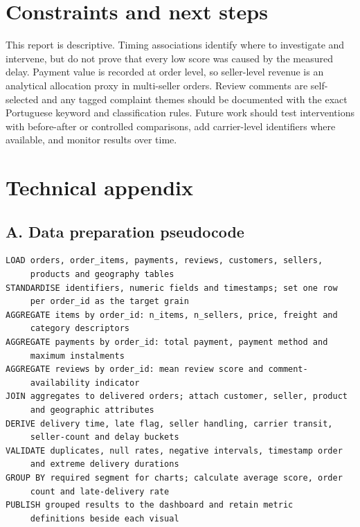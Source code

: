 \documentclass[11pt,a4paper]{article}
\begin{document}
\section{Constraints and next steps}

This report is descriptive. Timing associations identify where to investigate and intervene, but do not prove that every low score was caused by the measured delay. Payment value is recorded at order level, so seller-level revenue is an analytical allocation proxy in multi-seller orders. Review comments are self-selected and any tagged complaint themes should be documented with the exact Portuguese keyword and classification rules. Future work should test interventions with before-after or controlled comparisons, add carrier-level identifiers where available, and monitor results over time.

\newpage
\section*{Technical appendix}

\subsection*{A. Data preparation pseudocode}

\begin{verbatim}
LOAD orders, order_items, payments, reviews, customers, sellers,
     products and geography tables
STANDARDISE identifiers, numeric fields and timestamps; set one row
     per order_id as the target grain
AGGREGATE items by order_id: n_items, n_sellers, price, freight and
     category descriptors
AGGREGATE payments by order_id: total payment, payment method and
     maximum instalments
AGGREGATE reviews by order_id: mean review score and comment-
     availability indicator
JOIN aggregates to delivered orders; attach customer, seller, product
     and geographic attributes
DERIVE delivery time, late flag, seller handling, carrier transit,
     seller-count and delay buckets
VALIDATE duplicates, null rates, negative intervals, timestamp order
     and extreme delivery durations
GROUP BY required segment for charts; calculate average score, order
     count and late-delivery rate
PUBLISH grouped results to the dashboard and retain metric
     definitions beside each visual
\end{verbatim}
\end{document}
